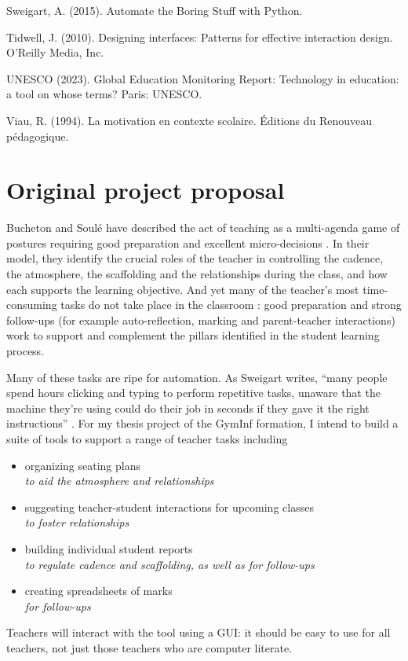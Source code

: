 \documentclass[10pt]{article}
\begin{document}
\begin{thebibliography}{Xyzz12}
 Sweigart, A. (2015). Automate the Boring Stuff with Python.

Tidwell, J. (2010). Designing interfaces: Patterns for effective interaction design. O'Reilly Media, Inc.

 UNESCO (2023). Global Education Monitoring Report: Technology in education: a tool on whose terms? Paris: UNESCO.

 Viau, R. (1994). La motivation en contexte scolaire. Éditions du Renouveau pédagogique.

\end{thebibliography}

\appendix

\section{Original project proposal}

Bucheton and Soulé have described the act of teaching as a multi-agenda game of postures requiring good preparation and excellent micro-decisions \cite{BS09}. In their model, they identify the crucial roles of the teacher in controlling the cadence, the atmosphere, the scaffolding and the relationships during the class, and how each supports the learning objective. And yet many of the teacher's most time-consuming tasks do not take place in the classroom \cite{Bryant20}: good preparation and strong follow-ups (for example auto-reflection, marking and parent-teacher interactions) work to support and complement the pillars identified in the student learning process.

Many of these tasks are ripe for automation. As Sweigart writes, ``many people spend hours clicking and typing to perform repetitive tasks, unaware that the machine they’re using could do their job in seconds if they gave it the right instructions'' \cite{Swei15}.  For my thesis project of the GymInf formation, I intend to build a suite of tools to support a range of teacher tasks including 
\begin{itemize} 
\item organizing seating plans \\
\emph{to aid the atmosphere and relationships} 
\item suggesting teacher-student interactions for upcoming classes \\
\emph{to foster relationships}
\item building individual student reports \\
\emph{to regulate cadence and scaffolding, as well as for follow-ups}
\item creating spreadsheets of marks \\
\emph{for follow-ups}
\end{itemize}
Teachers will interact with the tool using a GUI: it should be easy to use for all teachers, not just those teachers who are computer literate.
\end{document}
